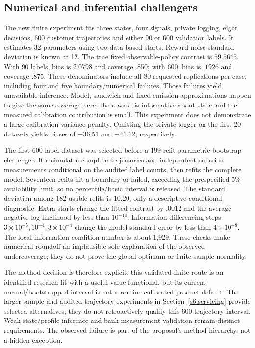 \subsection{Numerical and inferential challengers}
The new finite experiment fits three states, four signals, private logging,
eight decisions, 600 customer trajectories and either 90 or 600 validation
labels. It estimates 32 parameters using two data-based starts. Reward noise
standard deviation is known at 12. The true fixed observable-policy contrast
is $59.5645$. With 90 labels, bias is $2.0798$ and coverage .850; with 600,
bias is $.1926$ and coverage .875. These denominators include all 80 requested
replications per case, including four and five boundary/numerical failures.
Those failures yield unavailable inference. Model, sandwich and
fixed-emission approximations happen to give the same coverage here; the
reward is informative about state and the measured calibration contribution
is small. This experiment does not demonstrate a large calibration variance
penalty. Omitting the private logger on the first 20 datasets yields biases
of $-36.51$ and $-41.12$, respectively.

The first 600-label dataset was selected before a 199-refit parametric
bootstrap challenger. It resimulates complete trajectories and independent
emission measurements conditional on the audited label counts, then refits
the complete model. Seventeen refits hit a boundary or failed, exceeding the
prespecified 5\% availability limit, so no percentile/basic interval is
released. The standard deviation among 182 usable refits is $10.20$, only a
descriptive conditional diagnostic. Extra starts change the fitted contrast
by $.0012$ and the average negative log likelihood by less than $10^{-10}$.
Information differencing steps $3\times10^{-5},10^{-4},3\times10^{-4}$
change the model standard error by less than $4\times10^{-8}$. The local
information condition number is about 1,929. These checks make numerical
roundoff an implausible sole explanation of the observed undercoverage;
they do not prove the global optimum or finite-sample normality.

The method decision is therefore explicit: this validated finite route is
an identified research fit with a useful value functional, but its current
normal/bootstrapped interval is not a routine calibrated product default.
The larger-sample and audited-trajectory experiments in
Section~\ref{s6:servicing} provide selected alternatives; they do not
retroactively qualify this 600-trajectory interval. Weak-state/profile
inference and bank measurement validation remain distinct requirements. The observed
failure is part of the proposal's method hierarchy, not a hidden exception.

